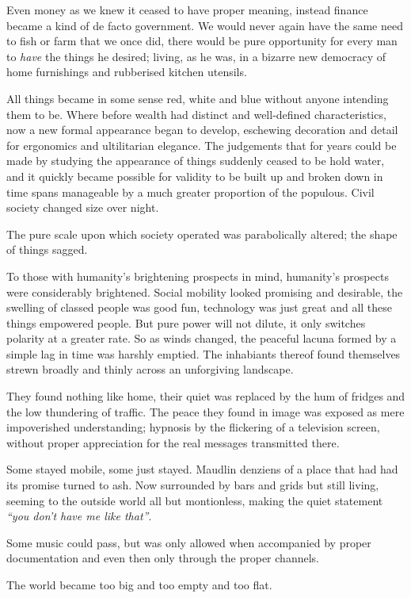 \documentclass{book}
\begin{document}
Even money as we knew it ceased to have proper meaning, instead finance became
a kind of de facto government. We would never again have the same need to fish
or farm that we once did, there would be pure opportunity for every man to
\emph{have} the things he desired; living, as he was, in a bizarre new
democracy of home furnishings and rubberised kitchen utensils.

All things became in some sense red, white and blue without anyone intending
them to be. Where before wealth had distinct and well-defined characteristics,
now a new formal appearance began to develop, eschewing decoration and detail
for ergonomics and ultilitarian elegance. The judgements that for years could
be made by studying the appearance of things suddenly ceased to be hold water,
and it quickly became possible for validity to be built up and broken down in
time spans manageable by a much greater proportion of the populous. Civil
society changed size over night.

The pure scale upon which society operated was parabolically altered; the shape
of things sagged.

To those with humanity's brightening prospects in mind, humanity's prospects
were considerably brightened. Social mobility looked promising and desirable,
the swelling of classed people was good fun, technology was just great and all
these things empowered people. But pure power will not dilute, it only switches
polarity at a greater rate. So as winds changed, the peaceful lacuna formed by
a simple lag in time was harshly emptied. The inhabiants thereof found
themselves strewn broadly and thinly across an unforgiving landscape.

They found nothing like home, their quiet was replaced by the hum of fridges
and the low thundering of traffic. The peace they found in image was exposed as
mere impoverished understanding; hypnosis by the flickering of a television
screen, without proper appreciation for the real messages transmitted there.

Some stayed mobile, some just stayed. Maudlin denziens of a place that had had
its promise turned to ash. Now surrounded by bars and grids but still living,
seeming to the outside world all but montionless, making the quiet statement
\emph{``you don't have me like that''}.

Some music
could pass, but was only allowed when accompanied by proper documentation and
even then only through the proper channels.

The world became too big and too empty and too flat.
\end{document}
